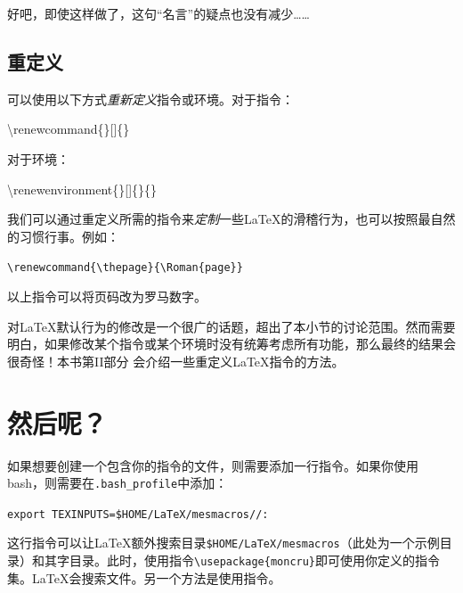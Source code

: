 好吧，即使这样做了，这句``名言''的疑点也没有减少……

\subsection{重定义}

可以使用以下方式\emph{重新定义}指令或环境。对于指令：

\begin{dmd}
\backslash renewcommand\{\}[]\{\}
\end{dmd}

对于环境：

\begin{dmd}
\backslash renewenvironment\{\}[]\{\}\{\}
\end{dmd}

我们可以通过重定义所需的指令来\emph{定制}一些\LaTeX 的滑稽行为，也可以按照最自然的习惯行事。例如：

\begin{dmd}
\verb|\renewcommand{\thepage}{\Roman{page}}|
\end{dmd}

以上指令可以将页码改为罗马数字。%

\begin{exclamation}
对\LaTeX 默认行为的修改是一个很广的话题，超出了本小节的讨论范围。然而需要明白，如果修改某个指令或某个环境时没有统筹考虑所有功能，那么最终的结果会很奇怪！本书第II部分%
会介绍一些重定义\LaTeX 指令的方法。
\end{exclamation}

\section{然后呢？}

如果想要创建一个包含你的指令的文件，则需要添加一行指令。如果你使用\textsf{bash}，则需要在\verb+.bash_profile+中添加：

\begin{dmd}
\verb|export TEXINPUTS=$HOME/LaTeX/mesmacros//:|
\end{dmd}

这行指令可以让\LaTeX 额外搜索目录\verb|$HOME/LaTeX/mesmacros|（此处为一个示例目录）和其字目录。此时，使用指令\verb|\usepackage{moncru}|即可使用你定义的指令集。\LaTeX 会搜索文件。另一个方法是使用指令\verb||。

